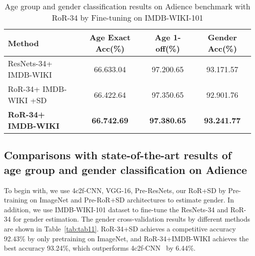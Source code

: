\documentclass[journal]{IEEEtran}
\begin{document}
\begin{table}[!t]
\renewcommand{\arraystretch}{1.3}
\caption{Age group and gender classification results on Adience benchmark with RoR-34 by Fine-tuning on IMDB-WIKI-101}
\label{tab:agegenderIMDB}
\centering
\begin{tabular}{|p{1.8cm}|c|c|c|}
\hline
Method                                       &Age Exact Acc(\%)            &Age 1-off(\%)                 &Gender Acc(\%) \\ \hline\hline
ResNets-34+  IMDB-WIKI                      &66.633.04               &97.200.65                &93.171.57                \\\hline
RoR-34+  IMDB-WIKI  +SD                       &66.422.64               &97.350.65                &92.901.76                            \\\hline
\textbf{RoR-34+  IMDB-WIKI}                           &\textbf{66.742.69}               &\textbf{97.380.65}                &\textbf{93.241.77}                \\\hline


\end{tabular}
\end{table}


\subsection{Comparisons with state-of-the-art results of age group and gender classification on Adience}

To begin with, we use 4c2f-CNN, VGG-16, Pre-ResNets, our RoR+SD by Pre-training on ImageNet and Pre-RoR+SD architectures to estimate gender. In addition, we use IMDB-WIKI-101 dataset to fine-tune the ResNets-34 and RoR-34 for gender estimation. The gender cross-validation results by different methods are shown in Table~\ref{tab:tab11}.  RoR-34+SD achieves a competitive accuracy 92.43\% by only pretraining on ImageNet, and RoR-34+IMDB-WIKI achieves the best accuracy 93.24\%, which outperforms 4c2f-CNN~\cite{Agegenderbycnn} by 6.44\%. 
\end{document}
